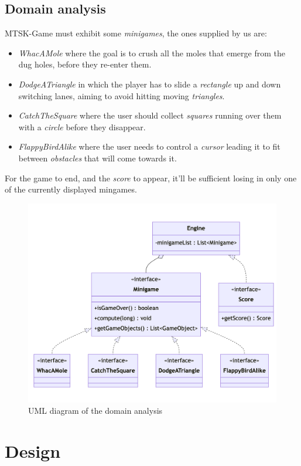 \documentclass[a4paper,12pt]{report}
\begin{document}
\section{Domain analysis}

MTSK-Game must exhibit some \textit{minigames}, the ones supplied by us are:
\begin{itemize} 
	\item \textit{WhacAMole} where the goal is to crush all the moles that emerge from the dug holes, before they re-enter them.
	\item \textit{DodgeATriangle} in which the player has to slide a \textit{rectangle} up and down switching lanes, aiming to avoid hitting moving \textit{triangles}.
	\item \textit{CatchTheSquare} where the user should collect \textit{squares} running over them with a \textit{circle} before they disappear.
	\item \textit{FlappyBirdAlike} where the user needs to control a \textit{cursor} leading it to fit between \textit{obstacles} that will come towards it.
\end{itemize}
For the game to end, and the \textit{score} to appear, it'll be sufficient losing in only one of the currently displayed mingames.


\begin{figure}[ht]
	\centering{}
	\includegraphics[width=\textwidth]{domain.png}
	\caption{UML diagram of the domain analysis}
\end{figure}

\chapter{Design}
\end{document}
